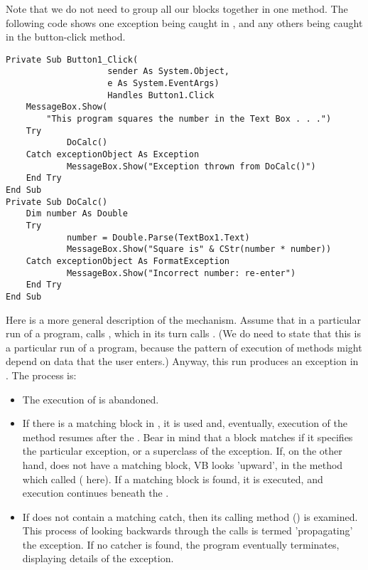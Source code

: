 		Note that we do not need to group all our  blocks together in one method. The following code shows one exception being caught in , and any others being caught in the button-click method.
		\begin{lstlisting}
Private Sub Button1_Click(
					sender As System.Object,
					e As System.EventArgs)
					Handles Button1.Click
	MessageBox.Show(
		"This program squares the number in the Text Box . . .")
	Try
			DoCalc()
	Catch exceptionObject As Exception
			MessageBox.Show("Exception thrown from DoCalc()")
	End Try
End Sub
Private Sub DoCalc()
	Dim number As Double
	Try
			number = Double.Parse(TextBox1.Text)
			MessageBox.Show("Square is" & CStr(number * number))
	Catch exceptionObject As FormatException
			MessageBox.Show("Incorrect number: re-enter")
	End Try
End Sub
		\end{lstlisting}
		Here is a more general description of the mechanism. Assume that in a particular run of a program,  calls , which in its turn calls . (We do need to state that this is a particular run of a program, because the pattern of execution of methods might depend on data that the user enters.) Anyway, this run produces an exception in . The process is:
		\begin{itemize}
      \item The execution of  is abandoned.
      \item If there is a matching  block in , it is used and, eventually, execution of the method resumes after the . Bear in mind that a  block matches if it specifies the particular exception, or a superclass of the exception.
				If, on the other hand,  does not have a matching  block, VB looks 'upward', in the method which called  ( here). If a matching  block is found, it is executed, and execution continues beneath the .
      \item If  does not contain a matching catch, then its calling method () is examined. This process of looking backwards through the calls is termed 'propagating' the exception. If no catcher is found, the program eventually terminates, displaying details of the exception.
		\end{itemize}


